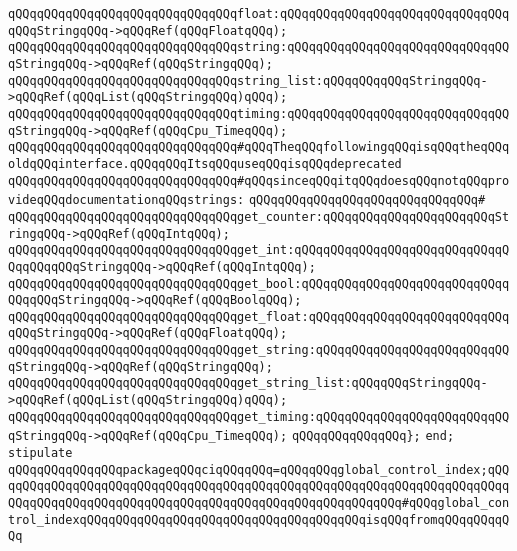 \verb|qQQqqQQqqQQqqQQqqQQqqQQqqQQqqQQqfloat:qQQqqQQqqQQqqQQqqQQqqQQqqQQqqQQqqQQqStringqQQq->qQQqRef(qQQqFloatqQQq);|\newline
\verb|qQQqqQQqqQQqqQQqqQQqqQQqqQQqqQQqstring:qQQqqQQqqQQqqQQqqQQqqQQqqQQqqQQqStringqQQq->qQQqRef(qQQqStringqQQq);|\newline
\verb|qQQqqQQqqQQqqQQqqQQqqQQqqQQqqQQqstring_list:qQQqqQQqqQQqStringqQQq->qQQqRef(qQQqList(qQQqStringqQQq)qQQq);|\newline
\verb|qQQqqQQqqQQqqQQqqQQqqQQqqQQqqQQqtiming:qQQqqQQqqQQqqQQqqQQqqQQqqQQqqQQqStringqQQq->qQQqRef(qQQqCpu_TimeqQQq);|\newline
\newline
\verb|qQQqqQQqqQQqqQQqqQQqqQQqqQQqqQQq#qQQqTheqQQqfollowingqQQqisqQQqtheqQQqoldqQQqinterface.qQQqqQQqItsqQQquseqQQqisqQQqdeprecated|\newline
\verb|qQQqqQQqqQQqqQQqqQQqqQQqqQQqqQQq#qQQqsinceqQQqitqQQqdoesqQQqnotqQQqprovideqQQqdocumentationqQQqstrings:|\newline
\verb|qQQqqQQqqQQqqQQqqQQqqQQqqQQqqQQq#|\newline
\verb|qQQqqQQqqQQqqQQqqQQqqQQqqQQqqQQqget_counter:qQQqqQQqqQQqqQQqqQQqqQQqStringqQQq->qQQqRef(qQQqIntqQQq);|\newline
\verb|qQQqqQQqqQQqqQQqqQQqqQQqqQQqqQQqget_int:qQQqqQQqqQQqqQQqqQQqqQQqqQQqqQQqqQQqqQQqStringqQQq->qQQqRef(qQQqIntqQQq);|\newline
\verb|qQQqqQQqqQQqqQQqqQQqqQQqqQQqqQQqget_bool:qQQqqQQqqQQqqQQqqQQqqQQqqQQqqQQqqQQqStringqQQq->qQQqRef(qQQqBoolqQQq);|\newline
\verb|qQQqqQQqqQQqqQQqqQQqqQQqqQQqqQQqget_float:qQQqqQQqqQQqqQQqqQQqqQQqqQQqqQQqStringqQQq->qQQqRef(qQQqFloatqQQq);|\newline
\verb|qQQqqQQqqQQqqQQqqQQqqQQqqQQqqQQqget_string:qQQqqQQqqQQqqQQqqQQqqQQqqQQqStringqQQq->qQQqRef(qQQqStringqQQq);|\newline
\verb|qQQqqQQqqQQqqQQqqQQqqQQqqQQqqQQqget_string_list:qQQqqQQqStringqQQq->qQQqRef(qQQqList(qQQqStringqQQq)qQQq);|\newline
\verb|qQQqqQQqqQQqqQQqqQQqqQQqqQQqqQQqget_timing:qQQqqQQqqQQqqQQqqQQqqQQqqQQqStringqQQq->qQQqRef(qQQqCpu_TimeqQQq);|\newline
\newline
\verb|qQQqqQQqqQQqqQQq};|\newline
\verb|end;|\newline
\newline
\verb|stipulate|\newline
\verb|qQQqqQQqqQQqqQQqpackageqQQqciqQQqqQQq=qQQqqQQqglobal_control_index;qQQqqQQqqQQqqQQqqQQqqQQqqQQqqQQqqQQqqQQqqQQqqQQqqQQqqQQqqQQqqQQqqQQqqQQqqQQqqQQqqQQqqQQqqQQqqQQqqQQqqQQqqQQqqQQqqQQqqQQqqQQqqQQq#qQQqglobal_control_indexqQQqqQQqqQQqqQQqqQQqqQQqqQQqqQQqqQQqqQQqisqQQqfromqQQqqQQqqQQq|\newline
